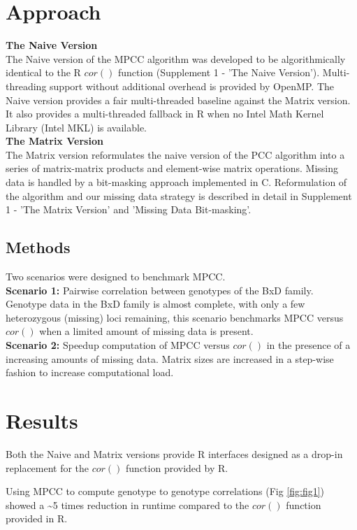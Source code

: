 \documentclass{bioinfo}
\begin{document}
\section{Approach}
\textbf{The Naive Version}\\
The Naive version of the MPCC algorithm was developed to be algorithmically identical 
to the R $cor()$ function (Supplement 1 - 'The Naive Version'). Multi-threading 
support without additional overhead is provided by OpenMP. The Naive version 
provides a fair multi-threaded baseline against the Matrix version. It also provides 
a multi-threaded fallback in R when no Intel\textregistered{} Math Kernel Library 
(Intel\textregistered{} MKL) is available.\\
\textbf{The Matrix Version}\\
The Matrix version reformulates the naive version of the PCC algorithm 
into a series of matrix-matrix products and element-wise matrix operations. 
Missing data is handled by a bit-masking approach implemented in C. 
Reformulation of the algorithm and our missing data strategy is described 
in detail in Supplement 1 - 'The Matrix Version' and 'Missing Data Bit-masking'. 
\vspace*{-5mm}
\begin{methods}
\section{Methods}
Two scenarios were designed to benchmark MPCC.\\
{\bf Scenario 1:} Pairwise correlation between genotypes of the BxD family. 
Genotype data in the BxD family is almost complete, with only a few heterozygous 
(missing) loci remaining, this scenario benchmarks MPCC versus $cor()$ when a limited 
amount of missing data is present.\\
{\bf Scenario 2:} Speedup computation of MPCC versus $cor()$ in the presence of a 
increasing amounts of missing data. Matrix sizes are increased in a step-wise fashion 
to increase computational load.
\end{methods}
\vspace*{-2mm}
\section{Results}
Both the Naive and Matrix versions provide R interfaces designed as a drop-in 
replacement for the $cor()$ function provided by R.

Using MPCC to compute genotype to genotype correlations (Fig \ref{fig:fig1}) 
showed a \textasciitilde{}5 times reduction in runtime compared to the 
$cor()$ function provided in R.
\end{document}
